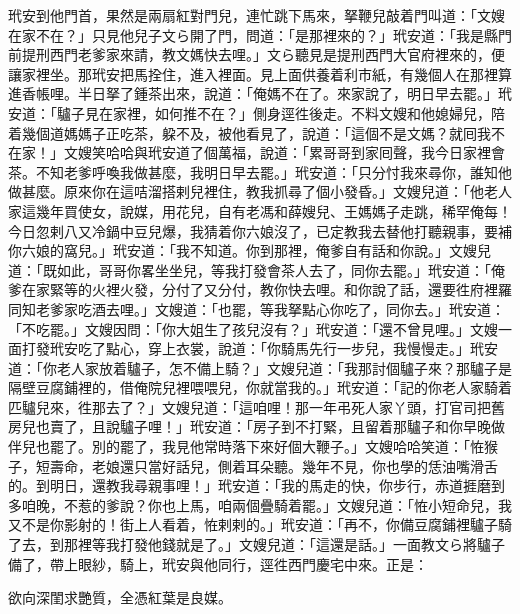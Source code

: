 玳安到他門首，果然是兩扇紅對門兒，連忙跳下馬來，拏鞭兒敲着門叫道：「文嫂在家不在？」只見他兒子文ら開了門，問道：「是那裡來的？」玳安道：「我是縣門前提刑西門老爹家來請，教文媽快去哩。」文ら聽見是提刑西門大官府裡來的，便讓家裡坐。那玳安把馬拴住，進入裡面。見上面供養着利市紙，有幾個人在那裡算進香帳哩。半日拏了鍾茶出來，說道：「俺媽不在了。來家說了，明日早去罷。」玳安道：「驢子見在家裡，如何推不在？」{}側身逕徃後走。不料文嫂和他媳婦兒，陪着幾個道媽媽子正吃茶，躱不及，被他看見了，說道：「這個不是文媽？就囘我不在家！」文嫂笑哈哈與玳安道了個萬福，說道：「累哥哥到家囘聲，我今日家裡會茶。不知老爹呼喚我做甚麼，我明日早去罷。」玳安道：「只分忖我來尋你，誰知他做甚麼。原來你在這咭溜搭剌兒裡住，教我抓尋了個小發昏。」文嫂兒道：「他老人家這幾年買使女，說媒，用花兒，自有老馮和薛嫂兒、王媽媽子走跳，稀罕俺每！今日忽剌八又冷鍋中豆兒爆，{}我猜着你六娘沒了，已定教我去替他打聽親事，要補你六娘的窩兒。」玳安道：「我不知道。你到那裡，俺爹自有話和你說。」文嫂兒道：「既如此，哥哥你畧坐坐兒，等我打發會茶人去了，同你去罷。」玳安道：「俺爹在家緊等的火裡火發，分付了又分付，教你快去哩。和你說了話，還要徃府裡羅同知老爹家吃酒去哩。」文嫂道：「也罷，等我拏點心你吃了，同你去。」玳安道：「不吃罷。」文嫂因問：「你大姐生了孩兒沒有？」玳安道：「還不曾見哩。」文嫂一面打發玳安吃了點心，穿上衣裳，說道：「你騎馬先行一步兒，我慢慢走。」玳安道：「你老人家放着驢子，怎不備上騎？」文嫂兒道：「我那討個驢子來？那驢子是隔壁豆腐鋪裡的，借俺院兒裡喂喂兒，你就當我的。」玳安道：「記的你老人家騎着匹驢兒來，徃那去了？」文嫂兒道：「這咱哩！那一年弔死人家丫頭，打官司把舊房兒也賣了，且說驢子哩！」玳安道：「房子到不打緊，且留着那驢子和你早晚做伴兒也罷了。別的罷了，我見他常時落下來好個大鞭子。」{}文嫂哈哈笑道：「恠猴子，短壽命，老娘還只當好話兒，側着耳朵聽。幾年不見，你也學的恁油嘴滑舌的。到明日，還教我尋親事哩！」玳安道：「我的馬走的快，你步行，赤道捱磨到多咱晚，不惹的爹說？你也上馬，咱兩個疊騎着罷。」文嫂兒道：「恠小短命兒，我又不是你影射的！街上人看着，恠剌剌的。」玳安道：「再不，你備豆腐鋪裡驢子騎了去，到那裡等我打發他錢就是了。」文嫂兒道：「這還是話。」一面教文ら將驢子備了，帶上眼紗，騎上，玳安與他同行，逕徃西門慶宅中來。正是：

\begin{myquote} 
欲向深閨求艷質，全憑紅葉是良媒。
\end{myquote} 


